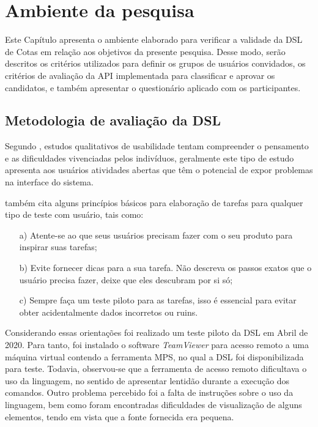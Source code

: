 \section{Ambiente da pesquisa}
\label{ambiente}
 Este Capítulo apresenta o ambiente elaborado para verificar a validade da DSL de Cotas em relação aos objetivos da presente pesquisa. Desse modo, serão descritos os critérios utilizados para definir os grupos de usuários convidados, os critérios de avaliação da \gls{API} implementada para classificar e aprovar os candidatos, e também apresentar o questionário aplicado com os participantes.
 
\subsection{Metodologia de avaliação da DSL}
\label{metododsl}

 Segundo , estudos qualitativos de usabilidade tentam compreender o pensamento e as dificuldades vivenciadas pelos indivíduos, geralmente este tipo de estudo apresenta aos usuários atividades abertas que têm o potencial de expor problemas na interface do sistema. 
 
  também cita alguns princípios básicos para elaboração de tarefas para qualquer tipo de teste com usuário, tais como:
 
 \begin{enumerate}
    \item[a)] Atente-se ao que seus usuários precisam fazer com o seu produto para inspirar suas tarefas;
    \item[b)] Evite fornecer dicas para a sua tarefa. Não descreva os passos exatos que o usuário precisa fazer, deixe que eles descubram por si só;
    \item[c)] Sempre faça um teste piloto para as tarefas, isso é essencial para evitar obter acidentalmente dados incorretos ou ruins.
    
\end{enumerate}
 
 Considerando essas orientações foi realizado um teste piloto da \gls{DSL} em Abril de 2020. Para tanto, foi instalado o software \textit{TeamViewer} para acesso remoto a uma máquina virtual contendo a ferramenta \gls{MPS}, no qual a DSL foi disponibilizada para teste. Todavia, observou-se que a ferramenta de acesso remoto dificultava o uso da linguagem, no sentido de apresentar lentidão durante a execução dos comandos. Outro problema percebido foi a falta de instruções sobre o uso da linguagem, bem como foram encontradas dificuldades de visualização de alguns elementos, tendo em vista que a fonte fornecida era pequena.
 
